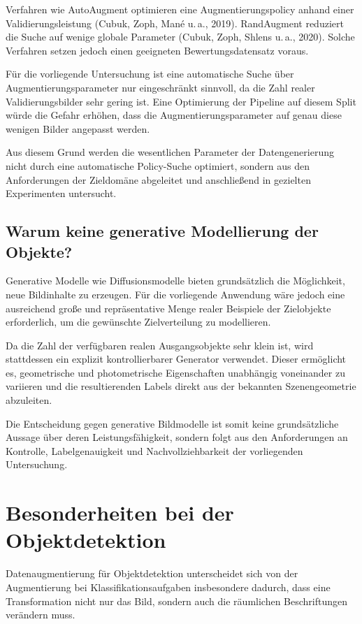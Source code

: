 Verfahren wie AutoAugment optimieren eine Augmentierungspolicy anhand einer Validierungsleistung (Cubuk, Zoph, Mané u.\,a., 2019). RandAugment reduziert die Suche auf wenige globale Parameter (Cubuk, Zoph, Shlens u.\,a., 2020). Solche Verfahren setzen jedoch einen geeigneten Bewertungsdatensatz voraus.

Für die vorliegende Untersuchung ist eine automatische Suche über Augmentierungsparameter nur eingeschränkt sinnvoll, da die Zahl realer Validierungsbilder sehr gering ist. Eine Optimierung der Pipeline auf diesem Split würde die Gefahr erhöhen, dass die Augmentierungsparameter auf genau diese wenigen Bilder angepasst werden.

Aus diesem Grund werden die wesentlichen Parameter der Datengenerierung nicht durch eine automatische Policy-Suche optimiert, sondern aus den Anforderungen der Zieldomäne abgeleitet und anschließend in gezielten Experimenten untersucht.

\subsection{Warum keine generative Modellierung der Objekte?}

Generative Modelle wie Diffusionsmodelle bieten grundsätzlich die Möglichkeit, neue Bildinhalte zu erzeugen. Für die vorliegende Anwendung wäre jedoch eine ausreichend große und repräsentative Menge realer Beispiele der Zielobjekte erforderlich, um die gewünschte Zielverteilung zu modellieren.

Da die Zahl der verfügbaren realen Ausgangsobjekte sehr klein ist, wird stattdessen ein explizit kontrollierbarer Generator verwendet. Dieser ermöglicht es, geometrische und photometrische Eigenschaften unabhängig voneinander zu variieren und die resultierenden Labels direkt aus der bekannten Szenengeometrie abzuleiten.

Die Entscheidung gegen generative Bildmodelle ist somit keine grundsätzliche Aussage über deren Leistungsfähigkeit, sondern folgt aus den Anforderungen an Kontrolle, Labelgenauigkeit und Nachvollziehbarkeit der vorliegenden Untersuchung.

\section{Besonderheiten bei der Objektdetektion}

Datenaugmentierung für Objektdetektion unterscheidet sich von der Augmentierung bei Klassifikationsaufgaben insbesondere dadurch, dass eine Transformation nicht nur das Bild, sondern auch die räumlichen Beschriftungen verändern muss.


